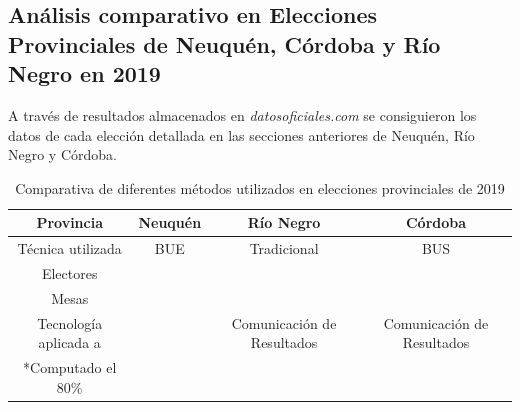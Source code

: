 \subsection{Análisis comparativo en Elecciones Provinciales de Neuquén, Córdoba y Río Negro en 2019}
A través de resultados almacenados en \textit{datosoficiales.com} se consiguieron los datos de cada elección detallada en las secciones anteriores de Neuquén, Río Negro y Córdoba.   \newline
{}
\begin{table}[]
    \centering
    \begin{tabular}{c|c|c|c}
         Provincia & Neuquén& Río Negro & Córdoba   \\
         \hline
         Técnica utilizada& BUE & Tradicional & BUS \\
         \hline
         Electores& & & \\
         \hline
         Mesas& & & \\
         \hline
         Tecnología aplicada a& &Comunicación de Resultados & Comunicación de Resultados \\
         \hline
         *Computado el 80\% & & & \\
         \hline
    \end{tabular}
    \caption{Comparativa de diferentes métodos utilizados en elecciones provinciales de 2019}
    \label{tab:comparativa}
\end{table}


